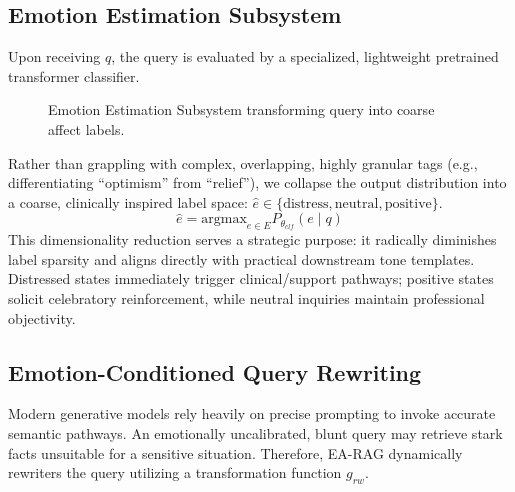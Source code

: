 \documentclass[conference]{IEEEtran}
\begin{document}
\subsection{Emotion Estimation Subsystem}
Upon receiving $q$, the query is evaluated by a specialized, lightweight pretrained transformer classifier. 
\begin{figure}[htbp]
\centering
{}
\caption{Emotion Estimation Subsystem transforming query into coarse affect labels.}
\label{fig:emotion_est}
\end{figure}

Rather than grappling with complex, overlapping, highly granular tags (e.g., differentiating ``optimism'' from ``relief''), we collapse the output distribution into a coarse, clinically inspired label space: $\hat{e} \in \{\text{distress}, \text{neutral}, \text{positive}\}$.
\begin{equation}
    \hat{e} = \text{argmax}_{e \in E} P_{\theta_{clf}}(e \mid q)
\end{equation}
This dimensionality reduction serves a strategic purpose: it radically diminishes label sparsity and aligns directly with practical downstream tone templates. Distressed states immediately trigger clinical/support pathways; positive states solicit celebratory reinforcement, while neutral inquiries maintain professional objectivity.

\subsection{Emotion-Conditioned Query Rewriting}
Modern generative models rely heavily on precise prompting to invoke accurate semantic pathways. An emotionally uncalibrated, blunt query may retrieve stark facts unsuitable for a sensitive situation. Therefore, EA-RAG dynamically rewriters the query utilizing a transformation function $g_{rw}$.
\end{document}
